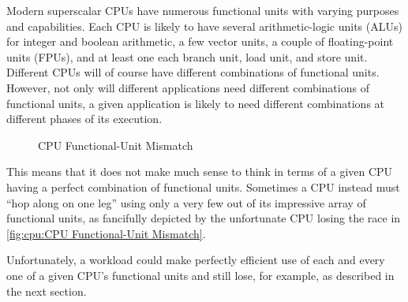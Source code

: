 Modern superscalar CPUs have numerous functional units with varying
purposes and capabilities.
Each CPU is likely to have several arithmetic-logic units (ALUs)
for integer and boolean arithmetic, a few vector units, a couple of
floating-point units (FPUs), and at least one each branch unit, load unit,
and store unit.
Different CPUs will of course have different combinations of functional
units.
However, not only will different applications need different combinations
of functional units, a given application is likely to need different
combinations at different phases of its execution.

\begin{figure}
\centering
{}
\caption{CPU Functional-Unit Mismatch}
\end{figure}

This means that it does not make much sense to think in terms of a given
CPU having a perfect combination of functional units.
Sometimes a CPU instead must ``hop along on one leg'' using only a
very few out of its impressive array of functional units, as fancifully
depicted by the unfortunate CPU losing the race in
\cref{fig:cpu:CPU Functional-Unit Mismatch}.

Unfortunately, a workload could make perfectly efficient use of each and
every one of a given CPU's functional units and still lose, for example,
as described in the next section.


